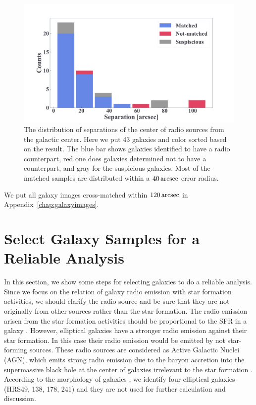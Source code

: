 \begin{figure}[htbp]
	\centering
	\includegraphics[width=.8\linewidth]{Chapter_4/Figures/Method_separation.pdf}
    \caption[Separation from the cross-matching]{\label{fig:separation}
        The distribution of separations of the center of radio sources from the galactic center.
        Here we put 43 galaxies and color sorted based on the result.
        The blue bar shows galaxies identified to have a radio counterpart, red one does galaxies determined not to have a counterpart, and gray for the suspicious galaxies.
        Most of the matched samples are distributed within a $40\,\mathrm{arcsec}$ error radius.
    }
\end{figure}

We put all galaxy images cross-matched within $120\,\mathrm{arcsec}$ in Appendix~\ref{chap:galaxyimages}.



\section{Select Galaxy Samples for a Reliable Analysis}\label{sec:reducegalaxysamples}

In this section, we show some steps for selecting galaxies to do a reliable analysis.
Since we focus on the relation of galaxy radio emission with star formation activities, we should clarify the radio source and be sure that they are not originally from other sources rather than the star formation.
The radio emission arisen from the star formation activities should be proportional to the SFR in a galaxy \citep{Condon1992a, Murphy2011}.
However, elliptical galaxies have a stronger radio emission against their star formation.
In this case their radio emission would be emitted by not star-forming sources.
These radio sources are considered as Active Galactic Nuclei (AGN), which emits strong radio emission due to the baryon accretion into the supermassive black hole at the center of galaxies irrelevant to the star formation \citep[e.g.,][]{Urry1995, Padovani2017}.
According to the morphology of galaxies \citep{Cortese2012}, we identify four elliptical galaxies (HRS49, 138, 178, 241) and they are not used for further calculation and discussion.

